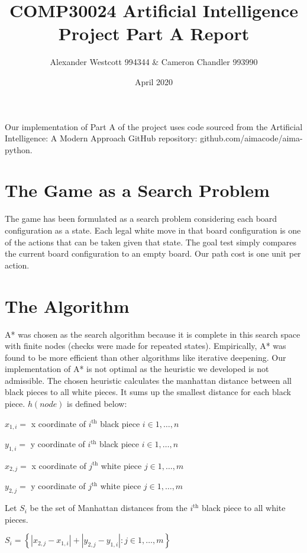 \documentclass[a4paper,11pt]{article}
\author{Alexander Westcott 994344 \& Cameron Chandler 993990}
\title{COMP30024 Artificial Intelligence Project Part A Report}
\date{April 2020}
\begin{document}
\maketitle

\noindent Our implementation of Part A of the project uses code sourced from the
Artificial Intelligence: A Modern Approach GitHub repository: github.com/aimacode/aima-python.

\section*{The Game as a Search Problem}

The game has been formulated as a search problem considering each board configuration as a state. 
Each legal white move in that board configuration is one of the actions that can be taken given that state. 
The goal test simply compares the current board configuration to an empty board. Our path cost is one unit per action. 

\section*{The Algorithm}

A* was chosen as the search algorithm because it is complete in this search space with finite nodes (checks were made for repeated states). 
Empirically, A* was found to be more efficient than other algorithms like iterative deepening. 
Our implementation of A* is not optimal as the heuristic we 
developed is not admissible. 
The chosen heuristic calculates the manhattan distance between all black pieces to all white pieces. 
It sums up the smallest distance for each black piece. $h(node)$ is defined below: \newline

$x_{1,i} =$ x coordinate of $i^{\text{th}}$ black piece $i \in {1,\dots,n}$

$y_{1,i} =$ y coordinate of $i^{\text{th}}$ black piece $i \in {1,\dots,n}$

$x_{2,j} =$ x coordinate of $j^{\text{th}}$ white piece $j \in {1,\dots,m}$

$y_{2,j} =$ y coordinate of $j^{\text{th}}$ white piece $j \in {1,\dots,m}$

Let $S_i$ be the set of Manhattan distances from the $i^{\text{th}}$ black piece to all white pieces.

$S_i = \left\{\left| x_{2,j} - x_{1,i}\right| + \left| y_{2,j} - y_{1,i}\right| :j \in 1,\dots,m\right\}$
\end{document}
